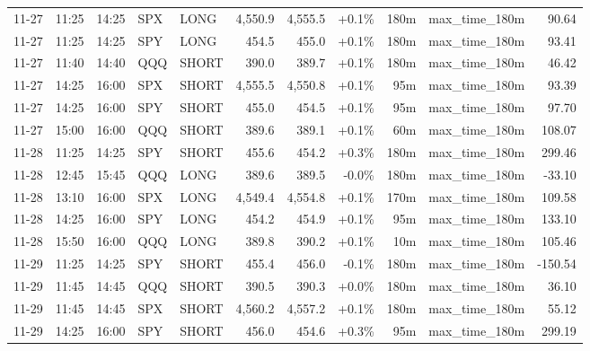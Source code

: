 \documentclass[11pt,a4paper,twoside]{article}
\begin{document}
\begin{center}
\begin{longtable}{>{\color{txtmain}}l l l l l r r r r >{\color{txtmain}}l r}
11-27 & 11:25 & 14:25 & SPX & LONG & 4,550.9 & 4,555.5 & \textcolor{wingreen}{+0.1\%} & 180m & max\_time\_180m & \textcolor{wingreen}{90.64} \\
11-27 & 11:25 & 14:25 & SPY & LONG & 454.5 & 455.0 & \textcolor{wingreen}{+0.1\%} & 180m & max\_time\_180m & \textcolor{wingreen}{93.41} \\
11-27 & 11:40 & 14:40 & QQQ & SHORT & 390.0 & 389.7 & \textcolor{wingreen}{+0.1\%} & 180m & max\_time\_180m & \textcolor{wingreen}{46.42} \\
11-27 & 14:25 & 16:00 & SPX & SHORT & 4,555.5 & 4,550.8 & \textcolor{wingreen}{+0.1\%} & 95m & max\_time\_180m & \textcolor{wingreen}{93.39} \\
11-27 & 14:25 & 16:00 & SPY & SHORT & 455.0 & 454.5 & \textcolor{wingreen}{+0.1\%} & 95m & max\_time\_180m & \textcolor{wingreen}{97.70} \\
11-27 & 15:00 & 16:00 & QQQ & SHORT & 389.6 & 389.1 & \textcolor{wingreen}{+0.1\%} & 60m & max\_time\_180m & \textcolor{wingreen}{108.07} \\
11-28 & 11:25 & 14:25 & SPY & SHORT & 455.6 & 454.2 & \textcolor{wingreen}{+0.3\%} & 180m & max\_time\_180m & \textcolor{wingreen}{299.46} \\
11-28 & 12:45 & 15:45 & QQQ & LONG & 389.6 & 389.5 & \textcolor{lossred}{-0.0\%} & 180m & max\_time\_180m & \textcolor{lossred}{-33.10} \\
11-28 & 13:10 & 16:00 & SPX & LONG & 4,549.4 & 4,554.8 & \textcolor{wingreen}{+0.1\%} & 170m & max\_time\_180m & \textcolor{wingreen}{109.58} \\
11-28 & 14:25 & 16:00 & SPY & LONG & 454.2 & 454.9 & \textcolor{wingreen}{+0.1\%} & 95m & max\_time\_180m & \textcolor{wingreen}{133.10} \\
11-28 & 15:50 & 16:00 & QQQ & LONG & 389.8 & 390.2 & \textcolor{wingreen}{+0.1\%} & 10m & max\_time\_180m & \textcolor{wingreen}{105.46} \\
11-29 & 11:25 & 14:25 & SPY & SHORT & 455.4 & 456.0 & \textcolor{lossred}{-0.1\%} & 180m & max\_time\_180m & \textcolor{lossred}{-150.54} \\
11-29 & 11:45 & 14:45 & QQQ & SHORT & 390.5 & 390.3 & \textcolor{wingreen}{+0.0\%} & 180m & max\_time\_180m & \textcolor{wingreen}{36.10} \\
11-29 & 11:45 & 14:45 & SPX & SHORT & 4,560.2 & 4,557.2 & \textcolor{wingreen}{+0.1\%} & 180m & max\_time\_180m & \textcolor{wingreen}{55.12} \\
11-29 & 14:25 & 16:00 & SPY & SHORT & 456.0 & 454.6 & \textcolor{wingreen}{+0.3\%} & 95m & max\_time\_180m & \textcolor{wingreen}{299.19} \\

\end{longtable}
\end{center}
\end{document}
